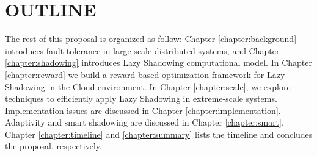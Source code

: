 \section{OUTLINE}
\label{outline}
The rest of this proposal is organized as follow:  
Chapter \ref{chapter:background} introduces fault tolerance in large-scale distributed systems, 
and Chapter \ref{chapter:shadowing} introduces Lazy Shadowing computational model. In Chapter \ref{chapter:reward} we build a reward-based optimization framework for Lazy Shadowing in the Cloud environment.
In Chapter \ref{chapter:scale}, we explore techniques to efficiently apply Lazy Shadowing in extreme-scale systems. 
Implementation issues are discussed in Chapter \ref{chapter:implementation}. Adaptivity and smart shadowing are discussed in Chapter \ref{chapter:smart}.
Chapter \ref{chapter:timeline} and \ref{chapter:summary} lists the timeline and concludes the proposal, respectively.









